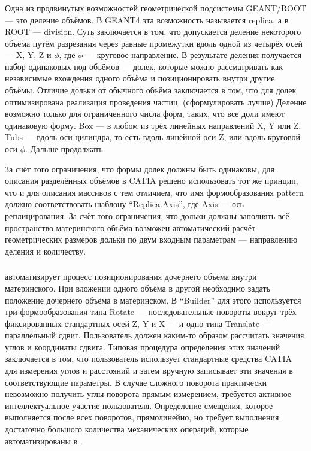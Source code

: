 \subsubsection{}\label{sec:Replica}

Одна из продвинутых возможностей геометрической подсистемы GEANT/ROOT --- это деление объёмов. В GEANT4 эта возможность называется replica, а в ROOT --- division. Суть заключается в том, что допускается деление некоторого объёма путём разрезания через равные промежутки вдоль одной из четырёх осей --- X, Y, Z и $\phi$, где $\phi$ --- круговое направление. В результате деления получается набор одинаковых под-объёмов --- долек, которые можно рассматривать как независимые вхождения одного объёма и позиционировать внутри другие объёмы. Отличие дольки от обычного объёма заключается в том, что для долек оптимизирована реализация проведения частиц. (\todo сформулировать лучше) Деление возможно только для ограниченного числа форм, таких, что все доли имеют одинаковую форму. Box --- в любом из трёх линейных направлений X, Y или Z. Tubs --- вдоль оси цилиндра, то есть вдоль линейной оси Z, или вдоль круговой оси $\phi$. Дальше продолжать\todo 

За счёт того ограничения, что формы долек должны быть одинаковы, для описания разделённых объёмов в CATIA решено использовать тот же принцип, что и для описания массивов с тем отличием, что имя формообразования pattern должно соответствовать шаблону ``Replica.Axis'', где Axis --- ось реплицирования. За счёт того ограничения, что дольки должны заполнять всё пространство материнского объёма возможен автоматический расчёт геометрических размеров дольки по двум входным параметрам --- направлению деления и количеству.

\subsubsection{}\label{sec:PointToPointAligner}

 автоматизирует процесс позиционирования дочернего объёма внутри материнского. При вложении одного объёма в другой необходимо задать положение дочернего объёма в материнском. В ``Builder'' для этого используется три формообразования типа Rotate --- последовательные повороты вокруг трёх фиксированных стандартных осей Z, Y и X --- и одно типа Translate --- параллельный сдвиг. Пользователь должен каким-то образом рассчитать значения углов и координаты сдвига. Типовая процедура определения этих значений заключается в том, что пользователь использует стандартные средства CATIA для измерения углов и расстояний и затем вручную записывает эти значения в соответствующие параметры. В случае сложного поворота практически невозможно получить углы поворота прямым измерением, требуется активное интеллектуальное участие пользователя. Определение смещения, которое выполняется после всех поворотов, прямолинейно, но требует выполнения достаточно большого количества механических операций, которые автоматизированы в .

